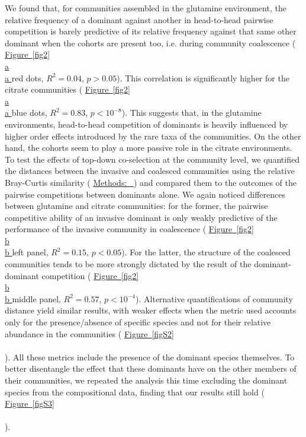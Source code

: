\documentclass[a4paper,10pt]{article}
\newcommand{\figref}[2][]{%
  \hyperref[{#2}]{%
    Figure~\ref*{#2}%
    \ifx\\#1\\%
    \else
      #1%
    \fi
  }%
}
\newcommand{\methodsref}[1]{%
  \hyperref[{methods:#1}]{%
   Methods:~\nameref*{methods:#1}%
  }%
}
\begin{document}
We found that, for communities assembled in the glutamine environment,
the relative frequency of a dominant against another in head-to-head pairwise competition
is barely predictive of its relative frequency against that same other dominant when the
cohorts are present too, i.e. during community coalescence
(\figref[a]{fig2} red dots, $R^2=0.04$, $p>0.05$).
This correlation is significantly higher for the citrate communities
 (\figref[a]{fig2} blue dots, $R^2=0.83$, $p<10^{-8}$).
This suggests that, in the glutamine environments, head-to-head competition of dominants
is heavily influenced by higher order effects introduced by the rare taxa of the communities.
On the other hand, the cohorts seem to play a more passive role in the citrate environments.
To test the effects of top-down co-selection at the community level,
we quantified the distances between the invasive and coalesced communities
using the relative Bray-Curtis similarity (\methodsref{metrics})
and compared them to the outcomes of the pairwise competitions between dominants alone.
We again noticed differences between glutamine and citrate communities:
for the former,
the pairwise competitive ability of an invasive dominant
is only weakly predictive of the performance of the invasive community in coalescence
(\figref[b]{fig2} left panel, $R^2=0.15$, $p<0.05$).
For the latter,
the structure of the coalesced communities tends to be more strongly dictated by the
result of the dominant-dominant competition
(\figref[b]{fig2} middle panel, $R^2=0.57$, $p<10^{-4}$).
Alternative quantifications of community distance yield similar results,
with weaker effects when the metric used
accounts only for the presence/absence of specific species and not for their relative abundance in
the communities
(\figref{figS2}).
All these metrics include the presence of the dominant species themselves. To better disentangle the effect
that these dominants have on the other members of their communities, we repeated the analysis this time
excluding the dominant species from the compositional data, finding that our results still hold
(\figref{figS3}).
\end{document}
